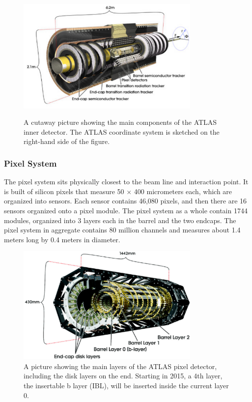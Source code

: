\begin{figure}
	\includegraphics[width=0.8\textwidth]{ATLASDetector/images/innerDetector.pdf}
	\label{fig:inner_detector}  
	\caption{A cutaway picture showing the main components of the ATLAS inner detector.  The ATLAS coordinate system is sketched on the right-hand side of the figure.}
\end{figure}


\subsubsection{Pixel System}
\label{sec:pixel}
The pixel system sits physically closest to the beam line and interaction point.  It is built of silicon pixels 
that measure 50 $\times$ 400 micrometers each, which are organized into sensors.  Each sensor contains 46,080 
pixels, and then there are 16 sensors organized onto a pixel module.  The pixel system as a whole contain 1744 
modules, organized into 3 layers each in the barrel and the two endcaps.  
The pixel system in aggregate contains 80 million channels and measures about 1.4 meters long by 0.4 meters in diameter.

\begin{figure}
	\includegraphics[width=0.8\textwidth]{ATLASDetector/images/pixel_detector.pdf} 
	\caption{A picture showing the main layers of the ATLAS pixel detector, including the disk layers on the end.  Starting in 2015, a 4th layer, the insertable b layer (IBL), will be inserted inside the current layer 0. 	\label{fig:inner_detector} }
\end{figure}

